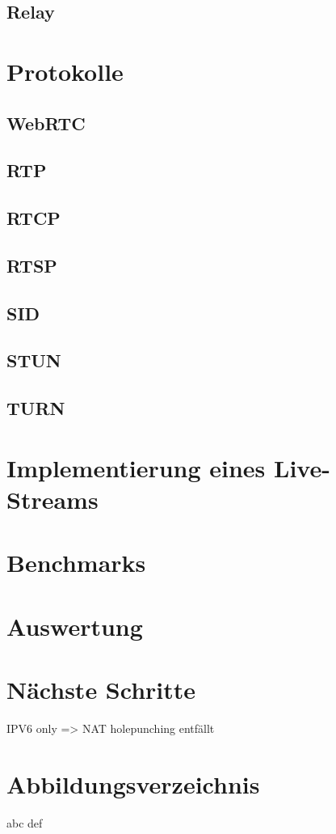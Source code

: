 \documentclass[journal]{IEEEtran}
\begin{document}
\subsection{Relay}
\lipsum[1-3][3-30]

\section{Protokolle}
\lipsum[1-2][2-3]
\subsection{WebRTC}
\lipsum[1-4][1-10]
\subsection{RTP}
\lipsum[1-3][3-30]
\subsection{RTCP}
\lipsum[1-4][1-10]
\subsection{RTSP}
\lipsum[1-3][3-30]
\subsection{SID}
\lipsum[1-2][2-3]
\subsection{STUN}
\lipsum[1-4][1-10]
\subsection{TURN}
\lipsum[1-2][2-3]

\section{Implementierung eines Live-Streams}
\lipsum[1-2][2-3]
\section{Benchmarks}
\lipsum[1-4][1-10]
\section{Auswertung}
\lipsum[1-2][2-3]

\section{Nächste Schritte}

\lipsum

\large{IPV6 only => NAT holepunching entfällt}

\section{Abbildungsverzeichnis}
abc
def



\end{document}
